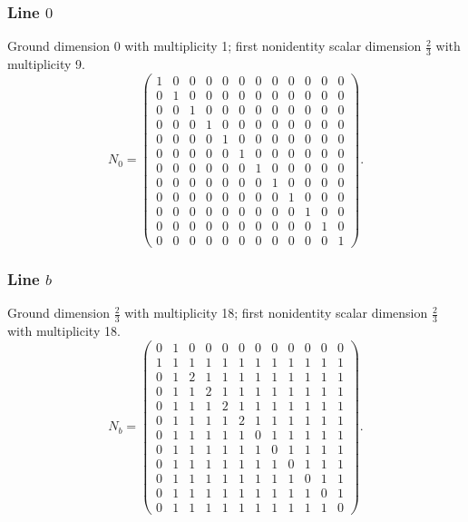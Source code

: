 \subsubsection*{Line $0$}
\noindent Ground dimension $0$ with multiplicity 1; first nonidentity scalar dimension $\frac{2}{3}$ with multiplicity 9.
\[\renewcommand{\arraystretch}{0.93}N_{0}=\left(\begin{array}{rrrrrrrrrrrr}
1&0&0&0&0&0&0&0&0&0&0&0\\
0&1&0&0&0&0&0&0&0&0&0&0\\
0&0&1&0&0&0&0&0&0&0&0&0\\
0&0&0&1&0&0&0&0&0&0&0&0\\
0&0&0&0&1&0&0&0&0&0&0&0\\
0&0&0&0&0&1&0&0&0&0&0&0\\
0&0&0&0&0&0&1&0&0&0&0&0\\
0&0&0&0&0&0&0&1&0&0&0&0\\
0&0&0&0&0&0&0&0&1&0&0&0\\
0&0&0&0&0&0&0&0&0&1&0&0\\
0&0&0&0&0&0&0&0&0&0&1&0\\
0&0&0&0&0&0&0&0&0&0&0&1
\end{array}\right).\]
\subsubsection*{Line $b$}
\noindent Ground dimension $\frac{2}{3}$ with multiplicity 18; first nonidentity scalar dimension $\frac{2}{3}$ with multiplicity 18.
\[\renewcommand{\arraystretch}{0.93}N_{b}=\left(\begin{array}{rrrrrrrrrrrr}
0&1&0&0&0&0&0&0&0&0&0&0\\
1&1&1&1&1&1&1&1&1&1&1&1\\
0&1&2&1&1&1&1&1&1&1&1&1\\
0&1&1&2&1&1&1&1&1&1&1&1\\
0&1&1&1&2&1&1&1&1&1&1&1\\
0&1&1&1&1&2&1&1&1&1&1&1\\
0&1&1&1&1&1&0&1&1&1&1&1\\
0&1&1&1&1&1&1&0&1&1&1&1\\
0&1&1&1&1&1&1&1&0&1&1&1\\
0&1&1&1&1&1&1&1&1&0&1&1\\
0&1&1&1&1&1&1&1&1&1&0&1\\
0&1&1&1&1&1&1&1&1&1&1&0
\end{array}\right).\]
